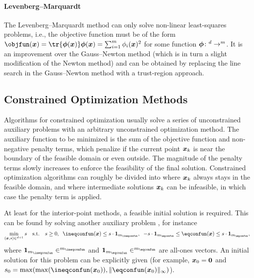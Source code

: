 \paragraph{Levenberg--Marquardt}

The Levenberg--Marquardt method
can only solve non-linear least-squares problems, i.e.,
the objective function must be of the form
$\objfun(\*x) = \tr{\*\phi(\*x)} \*\phi(\*x) = \sum_{i=1}^m \phi_i(\*x)^2$
for some function $\*\phi\colon \real^d \to \real^m$.
It is an improvement over the Gauss--Newton method
(which is in turn a slight modification of the Newton method)
and can be obtained by replacing the line search in the
Gauss--Newton method with a trust-region approach.



\subsection{Constrained Optimization Methods}
\label{sec:513gradientBasedConstrained}

Algorithms for constrained optimization usually
solve a series of unconstrained auxiliary problems with an arbitrary
unconstrained optimization method.
The auxiliary function to be minimized is
the sum of the objective function and non-negative penalty terms,
which penalize if the current point ${\boldsymbol{x}}_k$ is near the boundary
of the feasible domain or even outside.
The magnitude of the penalty terms slowly increases to enforce
the feasibility of the final solution.
Constrained optimization algorithms can roughly be divided
into 
where ${\boldsymbol{x}}_k$ always stays in the feasible domain,
and 
where intermediate solutions ${\boldsymbol{x}}_k$ can be infeasible,
in which case the penalty term is applied.

At least for the interior-point methods,
a feasible initial solution is required.
This can be found by solving another auxiliary problem
\cite{Toussaint15Introduction}, for instance
\begin{equation}
  \min_{(\*x, s) \in \real^{d+1}} s
  \quad\text{s.t.}\quad
  s \ge 0,\;\;
  \ineqconfun(\*x) \le s \cdot \*1_{m_{\ineqconfun}},\;\;
  -s \cdot \*1_{m_{\eqconfun}} \le \eqconfun(\*x) \le s \cdot \*1_{m_{\eqconfun}},
\end{equation}
where $\*1_{m_{\ineqconfun}} \in \real^{m_{\ineqconfun}}$ and
$\*1_{m_{\eqconfun}} \in \real^{m_{\eqconfun}}$ are all-ones vectors.
An initial solution for this problem can be explicitly given
(for example, ${\boldsymbol{x}}_0 = {\boldsymbol{0}}$ and
$s_0 = \max(\max(\ineqconfun(\*x_0)), \norm[\infty]{\eqconfun(\*x_0)})$).

